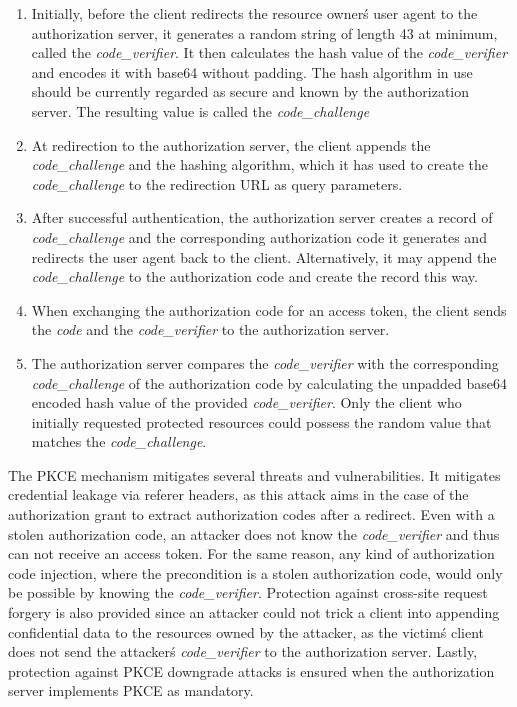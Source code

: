 \begin{enumerate}
	\item Initially, before the client redirects the resource owner\'s user agent to the authorization server, it generates a random string of length 43 at minimum, called the \emph{code\_verifier}. It then calculates the hash value of the \emph{code\_verifier} and encodes it with base64 without padding. The hash algorithm in use should be currently regarded as secure and known by the authorization server. The resulting value is called the \emph{code\_challenge}
	
	\item At redirection to the authorization server, the client appends the \emph{code\_challenge} and the hashing algorithm, which it has used to create the \emph{code\_challenge} to the redirection URL as query parameters.
	
	\item After successful authentication, the authorization server creates a record of \emph{code\_challenge} and the corresponding authorization code it generates and redirects the user agent back to the client. Alternatively, it may append the \emph{code\_challenge} to the authorization code and create the record this way.
	
	\item When exchanging the authorization code for an access token, the client sends the \emph{code} and the \emph{code\_verifier} to the authorization server.

	\item The authorization server compares the \emph{code\_verifier} with the corresponding \emph{code\_challenge} of the authorization code by calculating the unpadded base64 encoded hash value of the provided \emph{code\_verifier}. Only the client who initially requested protected resources could possess the random value that matches the \emph{code\_challenge}.
\end{enumerate}


The PKCE mechanism mitigates several threats and vulnerabilities. It mitigates credential leakage via referer headers, as this attack aims in the case of the authorization grant to extract authorization codes after a redirect. Even with a stolen authorization code, an attacker does not know the \emph{code\_verifier} and thus can not receive an access token. For the same reason, any kind of authorization code injection, where the precondition is a stolen authorization code, would only be possible by knowing the \emph{code\_verifier}. Protection against cross-site request forgery is also provided since an attacker could not trick a client into appending confidential data to the resources owned by the attacker, as the victim\'s client does not send the attacker\'s \emph{code\_verifier} to the authorization server. Lastly, protection against PKCE downgrade attacks is ensured when the authorization server implements PKCE as mandatory.

